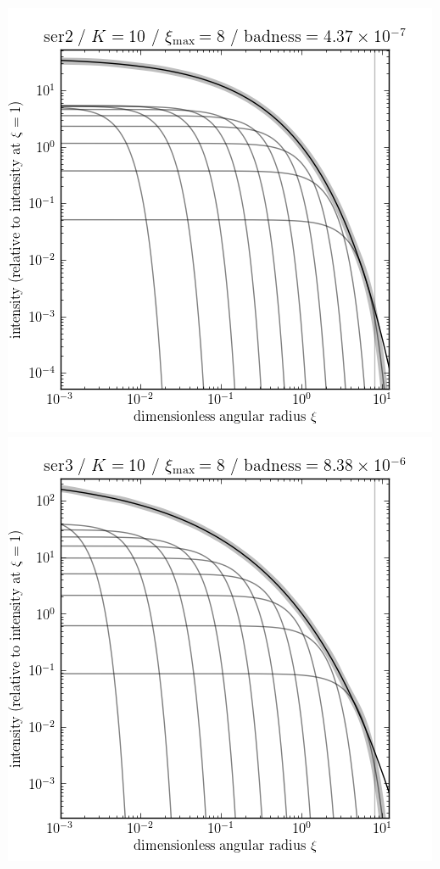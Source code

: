 \documentclass[12pt,pdftex,preprint]{aastex}
\newlength{\figurewidth}
\begin{document}
\clearpage
\begin{figure}
\includegraphics[width=\figurewidth]{ser2_K10_MR08_profile_log.png}%
\includegraphics[width=\figurewidth]{ser3_K10_MR08_profile_log.png}\\

\end{figure}
\end{document}
